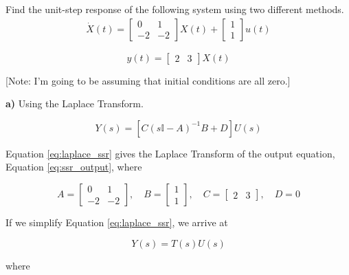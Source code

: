 \begin{question}{5}
Find the unit-step response of the following system using two different methods.
\begin{align}
\dot{X}(t) =
  \begin{bmatrix}
       0 &  1 \\
      -2 & -2
  \end{bmatrix}
    X(t) +
  \begin{bmatrix}
    1 \\ 1
  \end{bmatrix}
  u(t) \nonumber
\end{align}

\begin{equation} \label{eq:ssr_output}
y(t) = \begin{bmatrix} 2 & 3\end{bmatrix}X(t)
\end{equation}

[Note: I'm going to be assuming that initial conditions are all zero.]
\end{question}

\noindent \textbf{a)} Using the Laplace Transform.

\begin{equation} \label{eq:laplace_ssr}
Y(s) = [C (s\mathbb{I} - A)^{-1} B + D] U(s)
\end{equation}

Equation \ref{eq:laplace_ssr} gives the Laplace Transform of the output
equation, Equation \ref{eq:ssr_output}, where

\begin{equation}
 A =
 \begin{bmatrix}
      0 &  1 \\
     -2 & -2
 \end{bmatrix}, \quad
 B =
 \begin{bmatrix}
   1 \\ 1
 \end{bmatrix}, \quad
 C = \begin{bmatrix} 2 & 3\end{bmatrix}, \quad
 D = 0 \nonumber
\end{equation}

If we simplify Equation \ref{eq:laplace_ssr}, we arrive at

\begin{equation} \label{eq:laplace_output_tf}
Y(s) = T(s) U(s) \nonumber
\end{equation}

\noindent where

